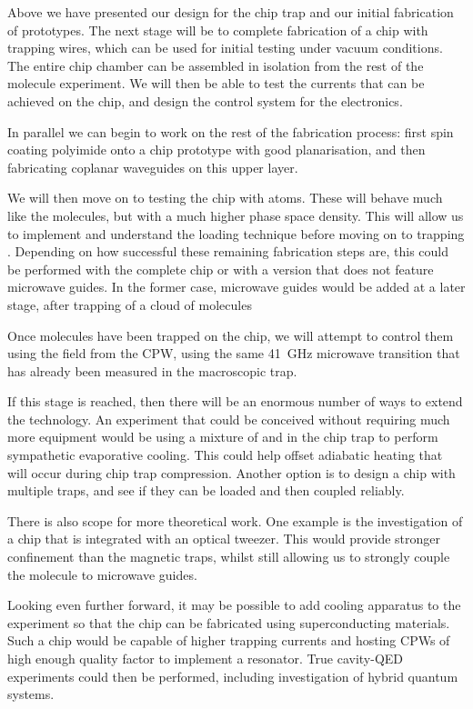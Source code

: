 Above we have presented our design for the chip trap and our initial
fabrication of prototypes. The next stage will be to complete fabrication of a
chip with trapping wires, which can be used for initial testing under vacuum
conditions. The entire chip chamber can be assembled in isolation from the rest
of the molecule experiment. We will then be able to test the currents that can
be achieved on the chip, and design the control system for the electronics.

In parallel we can begin to work on the rest of the fabrication process: first
spin coating polyimide onto a chip prototype with good planarisation, and then 
fabricating coplanar waveguides on this upper layer.

We will then move on to testing the chip with \Rb{} atoms. These will behave
much like the \CaF{} molecules, but with a much higher phase space density.
This will allow us to implement and understand the loading technique before
moving on to trapping \CaF{}. Depending on how successful these remaining
fabrication steps are, this could be performed with the complete chip or with a
version that does not feature microwave guides. In the former case, microwave
guides would be added at a later stage, after trapping of a cloud of molecules 

Once molecules have been trapped on the chip, we will attempt to control them
using the field from the CPW, using the same \SI{41}{\giga\hertz} microwave
transition that has already been measured in the macroscopic trap.

If this stage is reached, then there will be an enormous number of ways to
extend the technology. An experiment that could be conceived without requiring
much more equipment would be using a mixture of \esRb{} and \CaF{} in the chip
trap to perform sympathetic evaporative cooling. This could help offset
adiabatic heating that will occur during chip trap compression. Another option
is to design a chip with multiple traps, and see if they can be loaded and then
coupled reliably.

There is also scope for more theoretical work. One example is the investigation
of a chip that is integrated with an optical tweezer. This would provide
stronger confinement than the magnetic traps, whilst still allowing us to
strongly couple the molecule to microwave guides.

Looking even further forward, it may be possible to add cooling apparatus to
the experiment so that the chip can be fabricated using superconducting
materials. Such a chip would be capable of higher trapping currents and hosting
CPWs of high enough quality factor to implement a resonator. True cavity-QED
experiments could then be performed, including investigation of hybrid quantum
systems.
